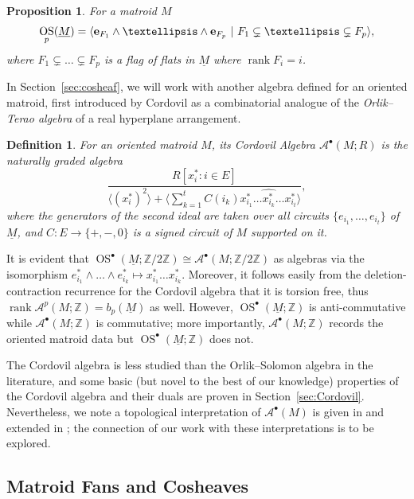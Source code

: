 \documentclass{amsart}
\newtheorem{proposition}[theorem]{Proposition}
\newtheorem{definition}[theorem]{Definition}
\newcommand\Acal{{\mathcal A}}
\newcommand\ee{{\bf e}}
\newcommand\ZZ{{\mathbb Z}}
\newcommand\Ztwo{{\mathbb Z}/2{\mathbb Z}}
\DeclareMathOperator{\rank}{rank}
\DeclareMathOperator{\OS}{OS}
\begin{document}
{\begin{proposition}\cite[Lemma~5]{Zhar_OS}\label{prop:OSZhar}
For a matroid $M$ 
\[\OS_p(\underline{M}) = \langle  \ee_{F_1} \wedge \dots \wedge \ee_{F_p} \ | \ F_1 \subsetneq \dots \subsetneq F_p \rangle, \]
where $F_1 \subsetneq \dots \subsetneq F_p$ is a flag of flats in $\underline{M}$ where $\rank F_i=i$.
\end{proposition}

In Section~\ref{sec:cosheaf}, we will work with another algebra defined for an oriented matroid, first introduced by Cordovil \cite{Cord02} as a combinatorial analogue of the {\em Orlik--Terao algebra} of a real hyperplane arrangement.

\begin{definition} \label{def:Cordovil}
For an oriented matroid $M$, its {\em Cordovil Algebra} $\Acal^\bullet(M; R)$ is the naturally graded algebra
\[ \frac{R[x^*_i:i\in E]}{\langle (x^*_i)^2\rangle+\langle \sum_{k=1}^t C(i_k) x^*_{i_1}\ldots\widehat{x^*_{i_k}}\ldots x^*_{i_t}\rangle},\] where the generators of the second ideal are taken over all circuits $\{e_{i_1},\ldots,e_{i_t}\}$ of $\underline{M}$, and $C:E\rightarrow\{+,-,0\}$ is a signed circuit of $M$ supported on it.
\end{definition}

It is evident that $\OS^\bullet(\underline{M}; \Ztwo)\cong\Acal^\bullet(M;\Ztwo)$ as algebras via the isomorphism $e^*_{i_1}\wedge\ldots\wedge e^*_{i_k}\mapsto x^*_{i_1}\ldots x^*_{i_k}$. Moreover, it follows easily from the deletion-contraction recurrence \cite[Theorem~2.7]{Cord02} for the Cordovil algebra that it is torsion free, thus $\rank \Acal^p(M;\ZZ)=b_p(\underline{M})$ as well. However, $\OS^\bullet(\underline{M}; \ZZ)$ is anti-commutative while $\Acal^\bullet(M;\ZZ)$ is commutative; more importantly, $\Acal^\bullet(M;\ZZ)$ records the oriented matroid data but $\OS^\bullet(\underline{M}; \ZZ)$ does not.

The Cordovil algebra is less studied than the Orlik--Solomon algebra in the literature, and some basic (but novel to the best of our knowledge) properties of the Cordovil algebra and their duals are proven in Section~\ref{sec:Cordovil}. Nevertheless, we note a topological interpretation of $\Acal^\bullet(M)$ is given in \cite{Mose17} and extended in \cite{DPW_COM}; the connection of our work with these interpretations is to be explored. 

\subsection{Matroid Fans and Cosheaves}

}
\end{document}
